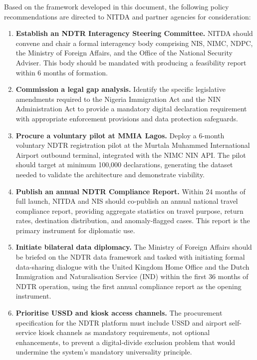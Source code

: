 \documentclass[11pt]{article}
\begin{document}
Based on the framework developed in this document, the following
policy recommendations are directed to NITDA and partner agencies
for consideration:

\begin{enumerate}[label=\textbf{R\arabic*.}, leftmargin=*, itemsep=6pt]

  \item \textbf{Establish an NDTR Interagency Steering Committee.}
  NITDA should convene and chair a formal interagency body comprising
  NIS, NIMC, NDPC, the Ministry of Foreign Affairs, and the Office of
  the National Security Adviser. This body should be mandated with
  producing a feasibility report within 6 months of formation.

  \item \textbf{Commission a legal gap analysis.}
  Identify the specific legislative amendments required to the Nigeria
  Immigration Act and the NIN Administration Act to provide a mandatory
  digital declaration requirement with appropriate enforcement provisions
  and data protection safeguards.

  \item \textbf{Procure a voluntary pilot at MMIA Lagos.}
  Deploy a 6-month voluntary NDTR registration pilot at the Murtala
  Muhammed International Airport outbound terminal, integrated with the
  NIMC NIN API. The pilot should target at minimum 100,000 declarations,
  generating the dataset needed to validate the architecture and
  demonstrate viability.

  \item \textbf{Publish an annual NDTR Compliance Report.}
  Within 24 months of full launch, NITDA and NIS should co-publish an
  annual national travel compliance report, providing aggregate statistics
  on travel purpose, return rates, destination distribution, and
  anomaly-flagged cases. This report is the primary instrument for
  diplomatic use.

  \item \textbf{Initiate bilateral data diplomacy.}
  The Ministry of Foreign Affairs should be briefed on the NDTR data
  framework and tasked with initiating formal data-sharing dialogue with
  the United Kingdom Home Office and the Dutch Immigration and
  Naturalisation Service (IND) within the first 36 months of NDTR
  operation, using the first annual compliance report as the opening
  instrument.

  \item \textbf{Prioritise USSD and kiosk access channels.}
  The procurement specification for the NDTR platform must include USSD
  and airport self-service kiosk channels as mandatory requirements,
  not optional enhancements, to prevent a digital-divide exclusion
  problem that would undermine the system's mandatory universality
  principle.


\end{enumerate}
\end{document}
